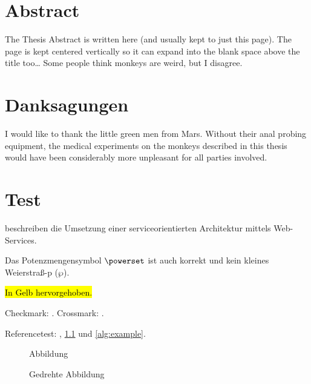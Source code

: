 \documentclass[paper=a5,twoside,fontsize=10pt, DIV=calc, headings=small, bibliography=totoc, listof=totoc]{scrbook}
\begin{document}
\chapter*{Abstract}
\begin{otherlanguage}{american}
The Thesis Abstract is written here (and usually kept to just this page). The page is kept centered vertically so it can expand into the blank space above the title too\ldots
Some people think monkeys are weird, but I disagree.
\end{otherlanguage}
\clearpage

\chapter*{Danksagungen}
I would like to thank the little green men from Mars. Without their anal probing equipment, the medical experiments on the monkeys described in this thesis would have been considerably more unpleasant for all parties involved.
\clearpage

\pagestyle{scrheadings}

\chapter{Test}
\label{chap:test}

\citeauthor{WSPA} \cite{WSPA} beschreiben die Umsetzung einer serviceorientierten Architektur mittels Web-Services.

Das Potenzmengensymbol $\powerset$ ist auch korrekt und kein kleines Weierstraß-p ($\wp$).


\hl{In Gelb hervorgehoben.}

Checkmark: \dingcheck. Crossmark: \dingcross.

Referencetest: , \cref{fig:Abbildung} und \cref{alg:example}.

\begin{figure}
\missingfigure{}
\caption{Abbildung}
\label{fig:Abbildung}
\end{figure}

\begin{landscape}
\begin{figure}
\missingfigure{}
\caption{Gedrehte Abbildung}
\label{fig:AbbildungGedreht}
\end{figure}
\end{landscape}
\end{document}
